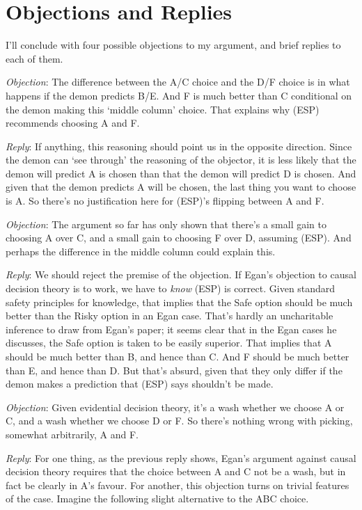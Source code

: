 \section{Objections and Replies}
I'll conclude with four possible objections to my argument, and brief replies to each of them.

\vspace{12 pt}
\noindent \textit{Objection}: The difference between the A/C choice and the D/F choice is in what happens if the demon predicts B/E. And F is much better than C conditional on the demon making this `middle column' choice. That explains why (ESP) recommends choosing A and F.

\noindent \textit{Reply}: If anything, this reasoning should point us in the opposite direction. Since the demon can `see through' the reasoning of the objector, it is less likely that the demon will predict A is chosen than that the demon will predict D is chosen. And given that the demon predicts A will be chosen, the last thing you want to choose is A. So there's no justification here for (ESP)'s flipping between A and F.

\vspace{12 pt}
\noindent \textit{Objection}: The argument so far has only shown that there's a small gain to choosing A over C, and a small gain to choosing F over D, assuming (ESP). And perhaps the difference in the middle column could explain this.

\noindent \textit{Reply}: We should reject the premise of the objection. If Egan's objection to causal decision theory is to work, we have to \textit{know} (ESP) is correct. Given standard safety principles for knowledge, that implies that the Safe option should be much better than the Risky option in an Egan case. That's hardly an uncharitable inference to draw from Egan's paper; it seems clear that in the Egan cases he discusses, the Safe option is taken to be easily superior. That implies that A should be much better than B, and hence than C. And F should be much better than E, and hence than D. But that's absurd, given that they only differ if the demon makes a prediction that (ESP) says shouldn't be made.

\vspace{12 pt}
\noindent \textit{Objection}: Given evidential decision theory, it's a wash whether we choose A or C, and a wash whether we choose D or F. So there's nothing wrong with picking, somewhat arbitrarily, A and F.

\noindent \textit{Reply}: For one thing, as the previous reply shows, Egan's argument against causal decision theory requires that the choice between A and C not be a wash, but in fact be clearly in A's favour. For another, this objection turns on trivial features of the case. Imagine the following slight alternative to the ABC choice.

